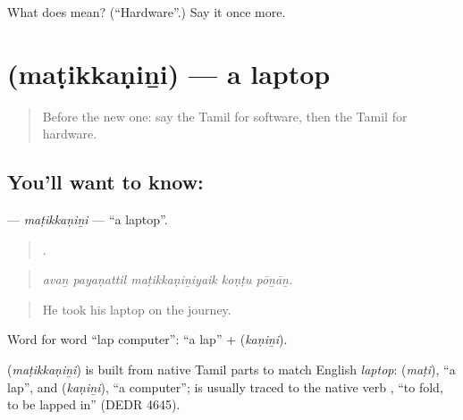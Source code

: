 \begin{tcolorbox}[breakable,colback=teal!4,colframe=teal!35!black,title={Before you move on}]
What does  mean? (\textquotedblleft{}Hardware\textquotedblright{}.) Say it once more.
\end{tcolorbox}
\section[\texorpdfstring{\ta{மடிக்கணினி} (maṭikkaṇiṉi)}{மடிக்கணினி (maṭikkaṇiṉi)}]{ (maṭikkaṇiṉi) — a laptop}

\label{lesson:TA-C515-matikkanini}



\begin{quote}
Before the new one: say the Tamil for software, then the Tamil for hardware.
\end{quote}

\subsection*{You'll want to know: }
\textbf{} — \emph{maṭikkaṇiṉi} — \textquotedblleft{}a laptop\textquotedblright{}.

\begin{quote}
    .
\end{quote}

\begin{quote}
\emph{avaṉ payaṇattil maṭikkaṇiṉiyaik koṇṭu pōṉāṉ.}
\end{quote}

\begin{quote}
He took his laptop on the journey.
\end{quote}

Word for word \textquotedblleft{}lap computer\textquotedblright{}:  \textquotedblleft{}a lap\textquotedblright{} +  (\emph{kaṇiṉi}).

\begin{cousinweb}
\textbf{} (\emph{maṭikkaṇiṉi}) is built from native Tamil parts to match English \emph{laptop}:  (\emph{maṭi}), \textquotedblleft{}a lap\textquotedblright{}, and  (\emph{kaṇiṉi}), \textquotedblleft{}a computer\textquotedblright{};  is usually traced to the native verb , \textquotedblleft{}to fold, to be lapped in\textquotedblright{} (DEDR 4645).
\end{cousinweb}

